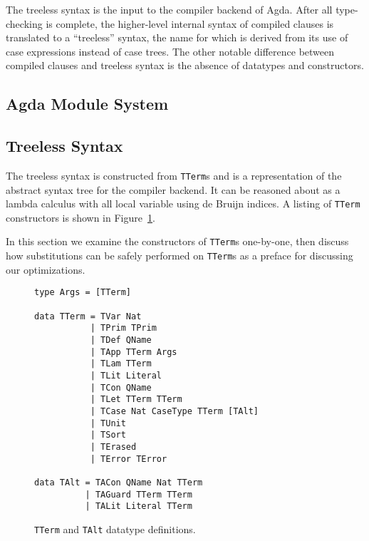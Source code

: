 
The treeless syntax is the input to the compiler backend of Agda. After all type-checking is complete, the higher-level internal syntax of compiled clauses is translated to a ``treeless'' syntax, the name for which is derived from its use of case expressions instead of case trees. The other notable difference between compiled clauses and treeless syntax is the absence of datatypes and constructors.\cite{agdahackage} %

\subsection{Agda Module System}

\subsection{Treeless Syntax}

The treeless syntax is constructed from \lstinline{TTerm}s %
and is a representation of the abstract syntax tree for the compiler backend. It can be reasoned about as a lambda calculus with all local variable using de Bruijn indices. A listing of \lstinline{TTerm} constructors is shown in Figure~\ref{code:TTerm}.

In this section we examine the constructors of \lstinline{TTerm}s one-by-one\cite{agdahackage}, then discuss how substitutions can be safely performed on \lstinline{TTerm}s as a preface for discussing our optimizations.


\begin{figure}
\begin{lstlisting}[style=blockhaskell]
type Args = [TTerm]

data TTerm = TVar Nat
           | TPrim TPrim
           | TDef QName
           | TApp TTerm Args
           | TLam TTerm
           | TLit Literal
           | TCon QName
           | TLet TTerm TTerm
           | TCase Nat CaseType TTerm [TAlt]
           | TUnit
           | TSort
           | TErased
           | TError TError

data TAlt = TACon QName Nat TTerm
          | TAGuard TTerm TTerm
          | TALit Literal TTerm
\end{lstlisting}
\caption{\lstinline{TTerm} and \lstinline{TAlt} datatype definitions.}
\label{code:TTerm}
\end{figure}

